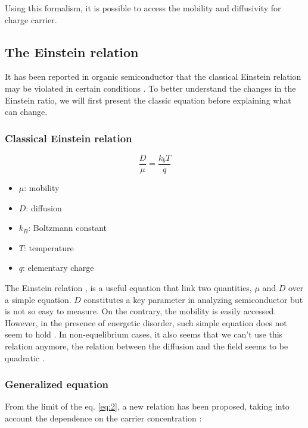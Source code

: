 Using this formalism, it is possible to access the mobility and diffusivity for charge carrier.

\subsection{The Einstein relation}

It has been reported in organic semiconductor that the classical Einstein relation may be violated in certain conditions \cite{general_einstein}. To better understand the changes in the Einstein ratio, we will first present the classic equation before explaining what can change.

\subsubsection{Classical Einstein relation}

\begin{equation}
    \frac{D}{\mu} = \frac{k_bT}{q}
    \label{eq:2}
\end{equation}

\begin{itemize}
    \setlength\itemsep{0.0em}
    \item $\mu$: mobility
    \item $D$: diffusion
    \item $k_B$: Boltzmann constant
    \item $T$: temperature
    \item $q$: elementary charge
\end{itemize}

The Einstein relation \cite{Einstein}, is a useful equation that link two quantities, $\mu$ and $D$ over a simple equation. $D$ constitutes a key parameter in analyzing semiconductor but is not so easy to measure. On the contrary, the mobility is easily accessed. However, in the presence of energetic disorder, such simple equation does not seem to hold \cite{ein_drift,ein_drift_2}. In non-equelibrium cases, it also seems that we can't use this relation anymore, the relation between the diffusion and the field seems to be quadratic \cite{diffusion_F}.

\subsubsection{Generalized equation}

From the limit of the eq. \ref{eq:2}, a new relation has been proposed, taking into account the dependence on the carrier concentration \cite{generalied_quasi}:

